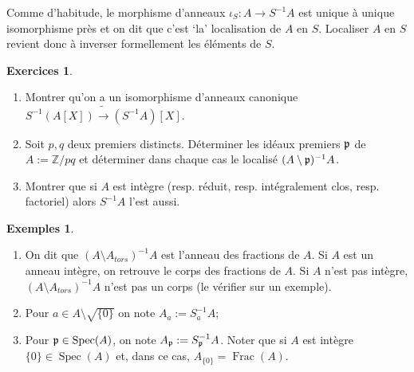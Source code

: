 \documentclass[a4paper, oneside, 12pt]{book}
\theoremstyle{theoremeStyle} %
\theoremstyle{definition} %
\newtheorem{exemples}[theoreme]{Exemples}
\newtheorem{exercices}[theoreme]{Exercices}
\DeclareMathOperator{\Spec}{Spec}
\DeclareMathOperator{\Frac}{Frac}
\newcommand{\Z}{\mathbb{Z}}
\begin{document}
  Comme d'habitude, le morphisme d'anneaux  $\iota_S:A\rightarrow S^{-1}A$ est unique à unique isomorphisme près et on dit que  c'est `la' localisation de $A$ en $S$. Localiser $A$ en $S$ revient donc à inverser formellement les éléments de $S$.  \\

 \begin{exercices}
	 \begin{enumerate}
		\item  Montrer qu'on a un isomorphisme  d'anneaux canonique \\ $S^{-1}(A[X])\tilde{\rightarrow} (S^{-1}A)[X]$.
		 \item Soit $p,q$ deux premiers distincts. Déterminer les idéaux premiers $\frak{p}$ de $A:=\Z/pq$ et déterminer dans chaque cas le localisé $(A\setminus \frak{p})^{-1}A$.
		 \item Montrer que si $A$ est intègre (resp. réduit, resp. intégralement clos, resp. factoriel) alors $S^{-1}A$ l'est aussi.\\
	 \end{enumerate}
 \end{exercices}






\begin{exemples}
	\begin{enumerate}
		\item On dit que $(A\setminus A_{tors})^{-1}A$ est l'anneau des fractions de $A$. Si $A$ est un anneau intègre, on retrouve le corps  des fractions de $A$. Si $A$ n'est pas intègre, $(A\setminus A_{tors})^{-1}A$ n'est pas un corps (le vérifier sur un exemple).
		\item Pour $a\in A\setminus \sqrt{\lbrace 0\rbrace}$ on note $A_a:=S_a^{-1}A $;
		\item Pour $\frak{p}\in \Spec(A)$, on note $A_\frak{p}:=S_{\frak{p}}^{-1}A$. Noter que si $A$ est intègre  $\lbrace 0\rbrace \in \Spec(A)$ et, dans ce cas, $A_{\lbrace 0\rbrace}=\Frac(A)$.
	\end{enumerate}
\end{exemples}
\end{document}
